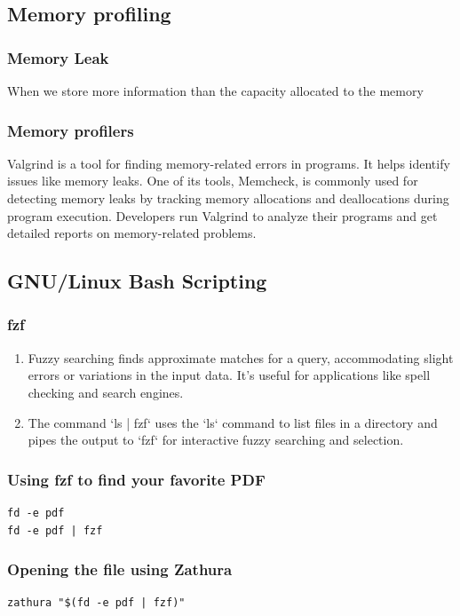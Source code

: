 \documentclass[titlepage]{article}
\begin{document}
\subsection{Memory profiling}

\subsubsection{Memory Leak}
When we store more information than the capacity allocated to the memory
\subsubsection{Memory profilers}
Valgrind is a tool for finding memory-related errors in programs. It helps identify issues like memory leaks. One of its tools, Memcheck, is commonly used for detecting memory leaks by tracking memory allocations and deallocations during program execution. Developers run Valgrind to analyze their programs and get detailed reports on memory-related problems.
\newpage
\subsection{GNU/Linux Bash Scripting}
\subsubsection{fzf}
\begin{enumerate}
    \item Fuzzy searching finds approximate matches for a query, accommodating slight errors or variations in the input data. It's useful for applications like spell checking and search engines.

    \item The command `ls | fzf` uses the `ls` command to list files in a directory and pipes the output to `fzf` for interactive fuzzy searching and selection.
\end{enumerate}
\subsubsection{Using fzf to find your favorite PDF}
\begin{verbatim}
fd -e pdf
fd -e pdf | fzf
\end{verbatim}
\subsubsection{Opening the file using Zathura}
\begin{verbatim}
zathura "$(fd -e pdf | fzf)"
\end{verbatim}
\end{document}
